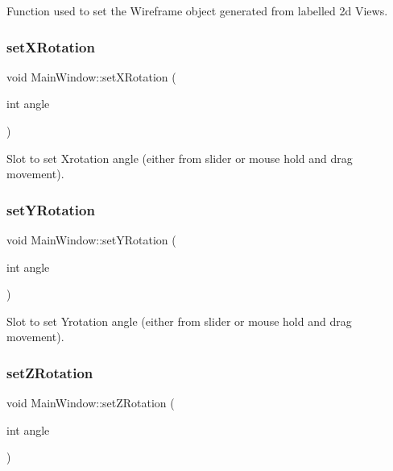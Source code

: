 Function used to set the Wireframe object generated from labelled 2d Views. 

\mbox{\label{classMainWindow_a91ab701961139d21df1c4f8d7b31b870}} 
\subsubsection{\texorpdfstring{set\+X\+Rotation}{setXRotation}}
{\footnotesize\ttfamily void Main\+Window\+::set\+X\+Rotation (\begin{DoxyParamCaption}\item[{int}]{angle }\end{DoxyParamCaption})\hspace{0.3cm}{\ttfamily [slot]}}



Slot to set Xrotation angle (either from slider or mouse hold and drag movement). 

\mbox{\label{classMainWindow_a023c99cfbdddc154e639d4d53b56a874}} 
\subsubsection{\texorpdfstring{set\+Y\+Rotation}{setYRotation}}
{\footnotesize\ttfamily void Main\+Window\+::set\+Y\+Rotation (\begin{DoxyParamCaption}\item[{int}]{angle }\end{DoxyParamCaption})\hspace{0.3cm}{\ttfamily [slot]}}



Slot to set Yrotation angle (either from slider or mouse hold and drag movement). 

\mbox{\label{classMainWindow_a3069f073ff2ba99fd601f4f607e77f8b}} 
\subsubsection{\texorpdfstring{set\+Z\+Rotation}{setZRotation}}
{\footnotesize\ttfamily void Main\+Window\+::set\+Z\+Rotation (\begin{DoxyParamCaption}\item[{int}]{angle }\end{DoxyParamCaption})\hspace{0.3cm}{\ttfamily [slot]}}



